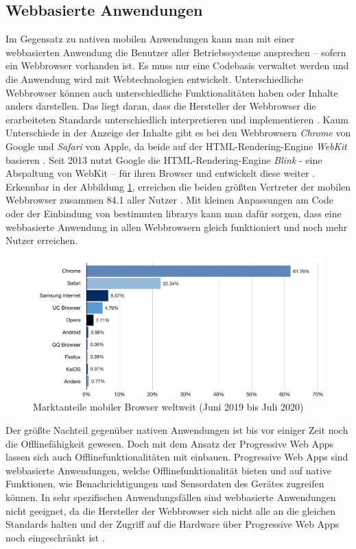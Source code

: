 \subsection{Webbasierte Anwendungen}
Im Gegensatz zu nativen mobilen Anwendungen kann man mit einer webbasierten Anwendung die Benutzer aller Betriebssysteme ansprechen – sofern ein Webbrowser vorhanden ist.
Es muss nur eine Codebasis verwaltet werden und die Anwendung wird mit Webtechnologien entwickelt.
Unterschiedliche Webbrowser können auch unterschiedliche Funktionalitäten haben oder Inhalte anders darstellen.
Das liegt daran, dass die Hersteller der Webbrowser die erarbeiteten Standards unterschiedlich interpretieren und implementieren \parencite{RED2016}.
Kaum Unterschiede in der Anzeige der Inhalte gibt es bei den Webbrowsern \textit{Chrome} von Google und \textit{Safari} von Apple, da beide auf der HTML-Rendering-Engine \textit{WebKit} basieren \parencite{PIC2008}.
Seit 2013 nutzt Google die HTML-Rendering-Engine \textit{Blink} - eine Abspaltung von WebKit – für ihren Browser und entwickelt diese weiter \parencite{BAR2013}.
Erkennbar in der Abbildung \ref{fig:browser-market-share}, erreichen die beiden größten Vertreter der mobilen Webbrowser zusammen \SI{84.1}{\prc} aller Nutzer \parencite{STA2020}.
Mit kleinen Anpassungen am Code oder der Einbindung von bestimmten \Glspl{library} kann man dafür sorgen, dass eine webbasierte Anwendung in allen Webbrowsern gleich funktioniert und noch mehr Nutzer erreichen.
\begin{figure}[h!]
	\includegraphics[scale=0.65]{images/browser-market-share}
	\caption{Marktanteile mobiler Browser weltweit (Juni 2019 bis Juli 2020)}
	\label{fig:browser-market-share}
\end{figure}
Der größte Nachteil gegenüber nativen Anwendungen ist bis vor einiger Zeit noch die Offlinefähigkeit gewesen.
Doch mit dem Ansatz der Progressive Web Apps lassen sich auch Offlinefunktionalitäten mit einbauen.
Progressive Web Apps sind webbasierte Anwendungen, welche Offlinefunktionalität bieten und auf native Funktionen, wie Benachrichtigungen und Sensordaten des Gerätes zugreifen können.
In sehr spezifischen Anwendungsfällen sind webbasierte Anwendungen nicht geeignet, da die Hersteller der Webbrowser sich nicht alle an die gleichen Standards halten und der Zugriff auf die Hardware über Progressive Web Apps noch eingeschränkt ist \parencite{TOR2020}.

